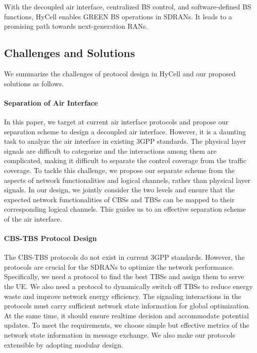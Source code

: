 \documentclass[conference]{IEEEtran}
\begin{document}
With the decoupled air interface, centralized BS control, and
software-defined BS functions,
HyCell enables GREEN BS operations in SDRANs.
It leads to a promising path towards next-generation RANs.

\subsection{Challenges and Solutions}
\label{sec:cha}

We summarize the challenges of protocol design in HyCell and our proposed
solutions as follows.

\paragraph{Separation of Air Interface}
In this paper, we target at current air interface protocols and propose our separation
scheme to design a decoupled air interface.
However,
it is a daunting task to analyze the air interface in existing 3GPP standards.
The physical layer signals are difficult to categorize and the
interactions among them are complicated, making it difficult to separate the
control coverage from the traffic coverage.
To tackle this challenge, we propose our separate scheme from the aspects of network
functionalities and logical channels, rather than physical layer signals.
In our design, we jointly consider the two levels and ensure that the expected
network functionalities of CBSs and TBSs can be mapped to their
corresponding logical channels. This guides us to an effective separation
scheme of the air interface.

\paragraph{CBS-TBS Protocol Design}
The CBS-TBS protocols do not exist in current 3GPP standards.
However, the protocols are crucial for the SDRANs to optimize the
network performance. Specifically, we need a protocol to find the best TBSs and
assign them to serve the UE. We also need a protocol to dynamically switch off TBSs
to reduce energy waste and improve network energy efficiency.
The signaling interactions in the protocols must carry sufficient network
state information for global optimization. At the same time, it should
ensure realtime decision and accommodate potential
updates. To meet the requirements, we choose simple but effective metrics of
the network state information in message exchange. We also make our protocols
extensible by adopting modular design.
\end{document}
